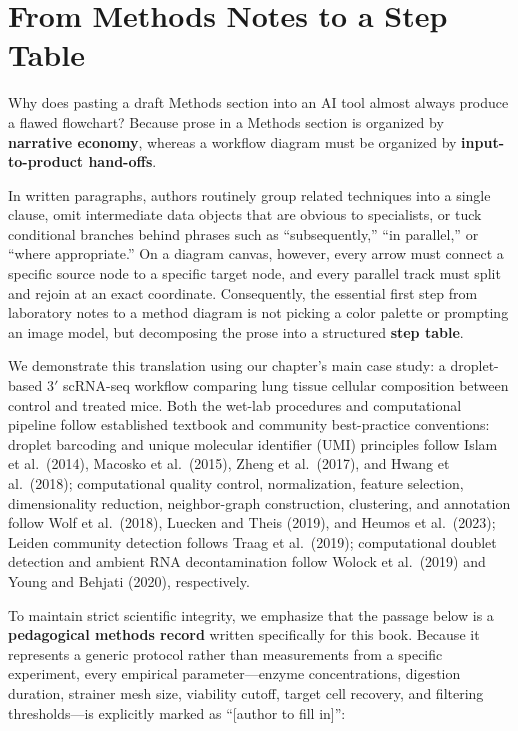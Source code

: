 \section{From Methods Notes to a Step Table}

Why does pasting a draft Methods section into an AI tool almost always produce a flawed flowchart? Because prose in a Methods section is organized by \textbf{narrative economy}, whereas a workflow diagram must be organized by \textbf{input-to-product hand-offs}.

In written paragraphs, authors routinely group related techniques into a single clause, omit intermediate data objects that are obvious to specialists, or tuck conditional branches behind phrases such as ``subsequently,'' ``in parallel,'' or ``where appropriate.'' On a diagram canvas, however, every arrow must connect a specific source node to a specific target node, and every parallel track must split and rejoin at an exact coordinate. Consequently, the essential first step from laboratory notes to a method diagram is not picking a color palette or prompting an image model, but decomposing the prose into a structured \textbf{step table}.

We demonstrate this translation using our chapter's main case study: a droplet-based 3$'$ scRNA-seq workflow comparing lung tissue cellular composition between control and treated mice. Both the wet-lab procedures and computational pipeline follow established textbook and community best-practice conventions: droplet barcoding and unique molecular identifier (UMI) principles follow Islam et al.\ (2014), Macosko et al.\ (2015), Zheng et al.\ (2017), and Hwang et al.\ (2018); computational quality control, normalization, feature selection, dimensionality reduction, neighbor-graph construction, clustering, and annotation follow Wolf et al.\ (2018), Luecken and Theis (2019), and Heumos et al.\ (2023); Leiden community detection follows Traag et al.\ (2019); computational doublet detection and ambient RNA decontamination follow Wolock et al.\ (2019) and Young and Behjati (2020), respectively.

To maintain strict scientific integrity, we emphasize that the passage below is a \textbf{pedagogical methods record} written specifically for this book. Because it represents a generic protocol rather than measurements from a specific experiment, every empirical parameter—enzyme concentrations, digestion duration, strainer mesh size, viability cutoff, target cell recovery, and filtering thresholds—is explicitly marked as ``[author to fill in]'':

